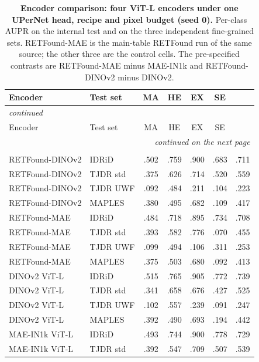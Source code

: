 
{\scriptsize\setlength{\tabcolsep}{3.2pt}\setlength{\LTcapwidth}{\textwidth}\renewcommand{\arraystretch}{1.08}
\begin{longtable}{l l c c c c c}
\caption{\textbf{Encoder comparison: four ViT-L encoders under one UPerNet head, recipe and pixel budget (seed 0).} Per-class AUPR on the internal test and on the three independent fine-grained sets. RETFound-MAE is the main-table RETFound run of the same source; the other three are the control cells. The pre-specified contrasts are RETFound-MAE minus MAE-IN1k and RETFound-DINOv2 minus DINOv2.}\label{stab:encoders}\\
\toprule
Encoder & Test set & MA & HE & EX & SE & \mAUPR{} \\
\midrule
\endfirsthead
\multicolumn{7}{l}{\textit{continued}}\\
\toprule
Encoder & Test set & MA & HE & EX & SE & \mAUPR{} \\
\midrule
\endhead
\midrule
\multicolumn{7}{r}{\textit{continued on the next page}}\\
\endfoot
\bottomrule
\endlastfoot
\multicolumn{7}{l}{\textbf{Trained on IDRiD}}\\
RETFound-DINOv2 & IDRiD & .502 & .759 & .900 & .683 & .711 \\
RETFound-DINOv2 & TJDR std & .375 & .626 & .714 & .520 & .559 \\
RETFound-DINOv2 & TJDR UWF & .092 & .484 & .211 & .104 & .223 \\
RETFound-DINOv2 & MAPLES & .380 & .495 & .682 & .109 & .417 \\
RETFound-MAE & IDRiD & .484 & .718 & .895 & .734 & .708 \\
RETFound-MAE & TJDR std & .393 & .582 & .776 & .070 & .455 \\
RETFound-MAE & TJDR UWF & .099 & .494 & .106 & .311 & .253 \\
RETFound-MAE & MAPLES & .375 & .503 & .680 & .092 & .413 \\
DINOv2 ViT-L & IDRiD & .515 & .765 & .905 & .772 & .739 \\
DINOv2 ViT-L & TJDR std & .341 & .658 & .676 & .427 & .525 \\
DINOv2 ViT-L & TJDR UWF & .102 & .557 & .239 & .091 & .247 \\
DINOv2 ViT-L & MAPLES & .392 & .490 & .693 & .194 & .442 \\
MAE-IN1k ViT-L & IDRiD & .493 & .744 & .900 & .778 & .729 \\
MAE-IN1k ViT-L & TJDR std & .392 & .547 & .709 & .507 & .539 \\

\end{longtable}}
